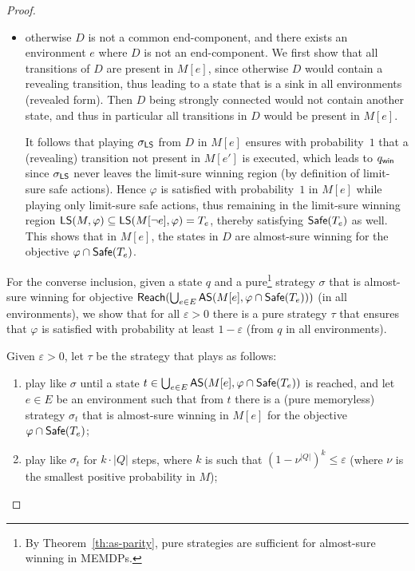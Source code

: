 \documentclass[a4paper,USenglish,cleveref, autoref, thm-restate]{lipics-v2021}
\let\epsilon\varepsilon
\def\abs#1{\ensuremath{\lvert #1 \rvert}}
\newcommand\almostsure{\textrm{\sf AS}}
\newcommand\limitsure{\textrm{\sf LS}}
\newcommand\Safe{\textrm{\sf Safe}}
\newcommand\Reach{\textrm{\sf Reach}}
\def\winabsorb{q_{\sf win}}
\begin{document}
\begin{proof}
\begin{itemize}
\item otherwise $D$ is not a common end-component, and there exists an environment $e$
where $D$ is not an end-component. 
We first show that all transitions of $D$ are present in $M[e]$, since otherwise $D$ 
would contain a revealing transition, thus leading to a state that is a sink in all environments (revealed form). 
Then $D$ being strongly connected would not contain another state, and thus in particular
all transitions in $D$ would be present in $M[e]$. 

It follows that playing $\sigma_{\limitsure}$ from $D$ in $M[e]$ ensures with
probability~$1$ that a (revealing) transition not present in $M[e']$ is executed,
which leads to $\winabsorb$ since $\sigma_{\limitsure}$ never leaves the 
limit-sure winning region (by definition of limit-sure safe actions).
Hence $\varphi$ is satisfied with probability~$1$ in $M[e]$ while playing
only limit-sure safe actions, thus remaining in the limit-sure winning region
$\limitsure(M, \varphi) \subseteq \limitsure(M[\lnot e], \varphi) = T_e$, 
thereby satisfying $\Safe(T_e)$ as well.
This shows that in $M[e]$, the states in $D$ are almost-sure winning 
for the objective $\varphi \cap \Safe(T_e)$.
\end{itemize}

For the converse inclusion, given a state $q$ and a pure\footnote{By Theorem~\ref{th:as-parity}, pure strategies are sufficient for almost-sure winning in MEMDPs.} strategy $\sigma$ 
that is almost-sure winning for objective 
$\Reach(\bigcup_{e \in E} \almostsure(M[e], \varphi \cap \Safe(T_e)))$
(in all environments), 
we show that for all $\epsilon > 0$ there is a pure strategy $\tau$
that ensures that $\varphi$ is satisfied with probability at least $1-\epsilon$
(from $q$ in all environments).

Given $\epsilon > 0$, let $\tau$ be the strategy that plays as follows:
\begin{enumerate}[label=(\theenumi)]
\item play like $\sigma$ until a state $t \in \bigcup_{e \in E} \almostsure(M[e], \varphi \cap \Safe(T_e))$
is reached, and let $e \in E$ be an environment
such that from $t$ there is a (pure memoryless) strategy $\sigma_t$
that is almost-sure winning in $M[e]$ for the objective $\varphi \cap \Safe(T_e)$; \label{tau-phase1}

\item play like $\sigma_t$ for $k \cdot \abs{Q}$ steps, where $k$ is such that
$(1-\nu^{\abs{Q}})^k \leq \epsilon$ (where $\nu$ is the smallest positive 
probability in $M$); \label{tau-phase2}


\end{enumerate}
\end{proof}
\end{document}
